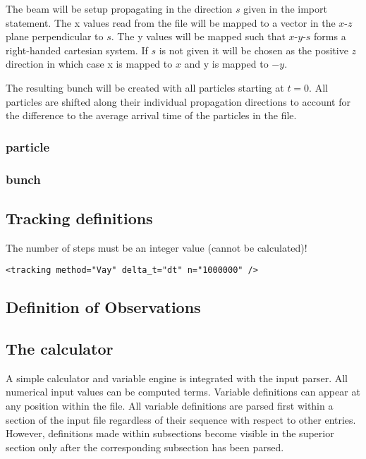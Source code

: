 \documentclass[11pt]{article}
\begin{document}
The beam will be setup propagating in the direction $s$ given in the import statement.
The x values read from the file will be mapped to a vector in the $x$-$z$ plane
perpendicular to $s$. The y values will be mapped such that $x$-$y$-$s$ forms
a right-handed cartesian system. If $s$ is not given it will be chosen as the positive $z$
direction in which case x is mapped to $x$ and y is mapped to $-y$.

The resulting bunch will be created with all particles starting at $t=0$.
All particles are shifted along their individual propagation directions
to account for the difference to the average arrival time of the particles in the file.

\subsubsection{particle}

\subsubsection{bunch}

\subsection{Tracking definitions}

The number of steps must be an integer value (cannot be calculated)!
\begin{lstlisting}
<tracking method="Vay" delta_t="dt" n="1000000" />
\end{lstlisting}


\subsection{Definition of Observations}


\subsection{The calculator}

A simple calculator and variable engine is integrated with
the input parser. All numerical input values can be computed terms.
Variable definitions can appear at any position within the file.
All variable definitions are parsed first within a section of the input file
regardless of their sequence with respect to other entries.
However, definitions made within subsections become visible in
the superior section only after the corresponding subsection has been parsed.
\end{document}
